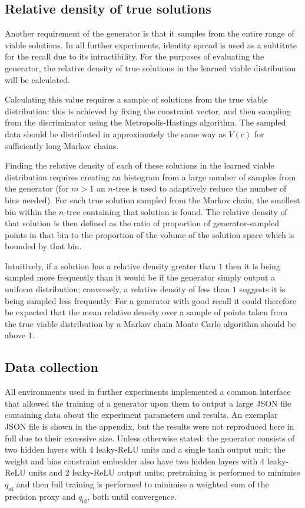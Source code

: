 \documentclass[../../main.tex]{subfiles}
\begin{document}
\subsection{Relative density of true solutions}

Another requirement of the generator is that it samples from the entire range of viable solutions.
In all further experiments, identity spread is used as a subtitute for the recall due to its intractibility.
For the purposes of evaluating the generator, the relative density of true solutions in the learned viable distribution will be calculated.

Calculating this value requires a sample of solutions from the true viable distribution: this is achieved by fixing the constraint vector, and then sampling from the discriminator using the Metropolis-Hastings algorithm.
The sampled data should be distributed in approximately the same way as $V(c)$ for sufficiently long Markov chains.

Finding the relative density of each of these solutions in the learned viable distribution requires creating an histogram from a large number of samples from the generator (for $m>1$ an $n$-tree is used to adaptively reduce the number of bins needed).
For each true solution sampled from the Markov chain, the smallest bin within the $n$-tree containing that solution is found.
The relative density of that solution is then defined as the ratio of proportion of generator-sampled points in that bin to the proportion of the volume of the solution space which is bounded by that bin.

Intuitively, if a solution has a relative density greater than $1$ then it is being sampled more frequently than it would be if the generator simply output a uniform distribution; conversely, a relative density of less than $1$ suggests it is being sampled less frequently.
For a generator with good recall it could therefore be expected that the mean relative density over a sample of points taken from the true viable distribution by a Markov chain Monte Carlo algorithm should be above $1$.

\subsection{Data collection}

All environments used in further experiments implemented a common interface that allowed the training of a generator upon them to output a large JSON file containing data about the experiment parameters and results.
An exemplar JSON file is shown in the appendix, but the results were not reproduced here in full due to their excessive size.
Unless otherwise stated: the generator consists of two hidden layers with 4 leaky-ReLU units and a single tanh output unit; the weight and bias constraint embedder also have two hidden layers with 4 leaky-ReLU units and 2 leaky-ReLU output units; pretraining is performed to minimise $q_\text{id}$ and then full training is performed to minimise a weighted sum of the precision proxy and $q_\text{id}$, both until convergence.
\end{document}
